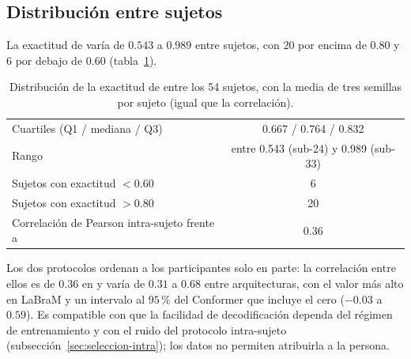 \subsection{Distribución entre sujetos}

La exactitud \loso{} de \eegnet{} varía de $0.543$ a $0.989$ entre sujetos, con $20$ por encima de
$0.80$ y $6$ por debajo de $0.60$ (tabla~\ref{tab:distribucion}).

\begin{table}[H]
\centering
\caption{Distribución de la exactitud \loso{} de \eegnet{} entre los 54 sujetos, con la media de tres semillas por sujeto (igual que la correlación).}
\label{tab:distribucion}
\begin{tabular}{p{7.5cm}c}
\toprule
Cuartiles (Q1 / mediana / Q3) & 0.667 / 0.764 / 0.832 \\
Rango & entre 0.543 (sub-24) y 0.989 (sub-33) \\
Sujetos con exactitud $< 0.60$ & 6 \\
Sujetos con exactitud $> 0.80$ & 20 \\
Correlación de Pearson intra-sujeto frente a \loso{} & 0.36 \\
\bottomrule
\end{tabular}
\end{table}

Los dos protocolos ordenan a los participantes solo en parte: la correlación entre ellos es de
$0.36$ en \eegnet{} y varía de $0.31$ a $0.68$ entre arquitecturas, con el valor más alto en LaBraM y
un intervalo al $95$\,\% del Conformer que incluye el cero ($-0.03$ a $0.59$). Es compatible con que la
facilidad de decodificación dependa del régimen de entrenamiento y con el ruido del protocolo
intra-sujeto (subsección~\ref{sec:seleccion-intra}); los datos no permiten atribuirla a la persona.

